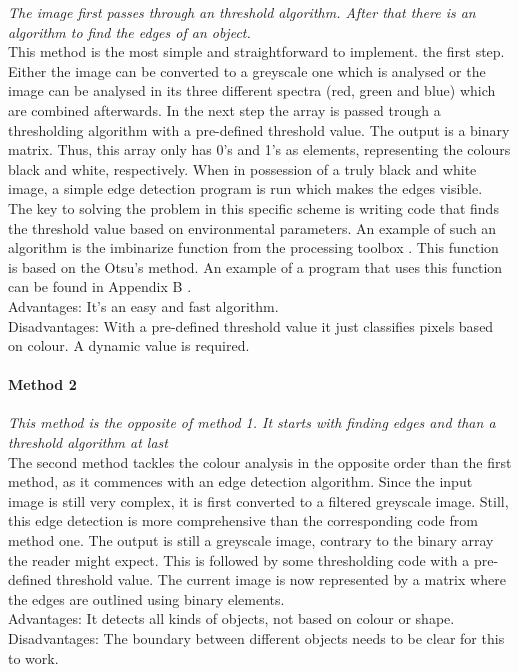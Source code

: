 \documentclass{article}
\begin{document}
\textit{The image first passes through an threshold algorithm. After that there is an algorithm to find the edges of an object.}\\ 
This method is the most simple and straightforward to implement. the first step. Either the image can be converted to a greyscale one which is analysed or the image can be analysed in its three different spectra (red, green and blue) which are combined afterwards. In the next step the array is passed trough a thresholding algorithm with a pre-defined threshold value. The output is a binary matrix. Thus, this array only has 0's and 1's as elements, representing the colours black and white, respectively. When in possession of a truly black and white image, a simple edge detection program is run which makes the edges visible.\\
The key to solving the problem in this specific scheme is writing code that finds the threshold value based on environmental parameters. An example of such an algorithm is the imbinarize function from the processing toolbox \cite{Mathworks}. This function is based on the Otsu's method. An example of a program that uses this function can be found in Appendix B \cite{threshold}.
\\Advantages: It’s an easy and fast algorithm.
\\Disadvantages: With a pre-defined threshold value it just classifies pixels based on colour. A dynamic value is required.
\paragraph{Method 2}
\textit{This method is the opposite of method 1. It starts with finding edges and than a threshold algorithm at last}\\
The second method tackles the colour analysis in the opposite order than the first method, as it commences with an edge detection algorithm. Since the input image is still very complex, it is first converted to a filtered greyscale image. Still, this edge detection is more comprehensive than the corresponding code from method one. The output is still a greyscale image, contrary to the binary array the reader might expect. This is followed by some thresholding code with a pre-defined threshold value. The current image is now represented by a matrix where the edges are outlined using binary elements.
\\Advantages: It detects all kinds of objects, not based on colour or shape.
\\Disadvantages: The boundary between different objects needs to be clear for this to work.
\end{document}
